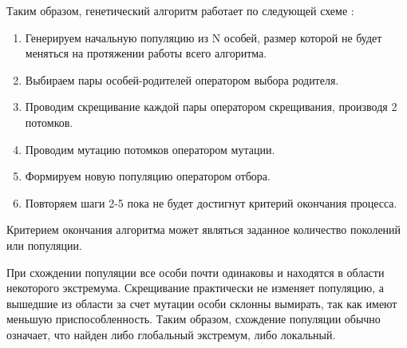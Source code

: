 Таким образом, генетический алгоритм работает по следующей схеме \cite{algGA}:
\begin{enumerate}
	\item Генерируем начальную популяцию из N особей, размер которой не будет меняться на протяжении работы всего алгоритма.
	\item Выбираем пары особей-родителей оператором выбора родителя.
	\item Проводим скрещивание каждой пары оператором скрещивания, производя 2 потомков.
	\item Проводим мутацию потомков оператором мутации.
	\item Формируем новую популяцию оператором отбора.
	\item Повторяем шаги 2-5 пока не будет достигнут критерий окончания процесса.
\end{enumerate}

Критерием окончания алгоритма может являться заданное количество поколений или  популяции.

При схождении популяции все особи почти одинаковы и находятся в области некоторого экстремума. Скрещивание практически не изменяет популяцию, а вышедшие из области за счет мутации особи склонны вымирать, так как имеют меньшую приспособленность. Таким образом, схождение популяции обычно означает, что найден либо глобальный экстремум, либо локальный.

